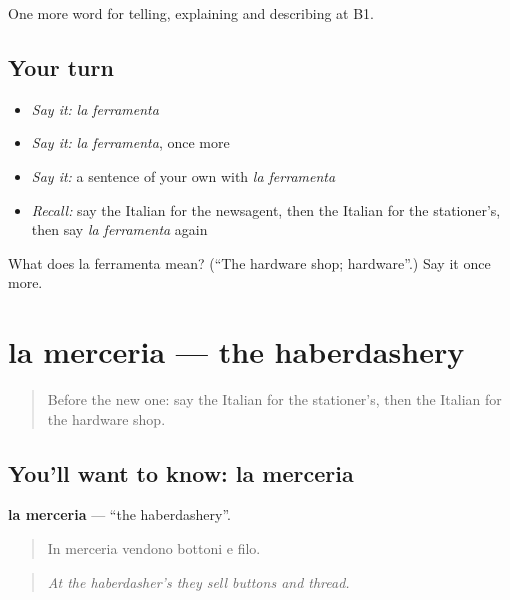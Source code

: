 \begin{grammarlens}[title={What you've built}]
One more word for telling, explaining and describing at B1.
\end{grammarlens}

\subsection*{Your turn}
\begin{itemize}
\raggedright
  \item \emph{Say it:} \emph{la ferramenta}
  \item \emph{Say it:} \emph{la ferramenta}, once more
  \item \emph{Say it:} a sentence of your own with \emph{la ferramenta}
  \item \emph{Recall:} say the Italian for the newsagent, then the Italian for the stationer's, then say \emph{la ferramenta} again
\end{itemize}

\begin{tcolorbox}[breakable,colback=teal!4,colframe=teal!35!black,title={Before you move on}]
What does la ferramenta mean? (\textquotedblleft{}The hardware shop; hardware\textquotedblright{}.) Say it once more.
\end{tcolorbox}
\section[la merceria]{la merceria — the haberdashery}

\label{lesson:IT-C453-merceria}



\begin{quote}
Before the new one: say the Italian for the stationer's, then the Italian for the hardware shop.
\end{quote}

\subsection*{You'll want to know: la merceria}
\textbf{la merceria} — \textquotedblleft{}the haberdashery\textquotedblright{}.

\begin{quote}
In merceria vendono bottoni e filo.
\end{quote}

\begin{quote}
\emph{At the haberdasher's they sell buttons and thread.}
\end{quote}


